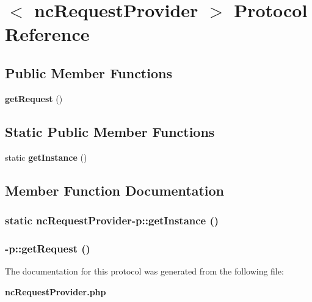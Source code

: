 \section{$<$ ncRequestProvider $>$ Protocol Reference}
\label{protocolncRequestProvider-p}
\subsection*{Public Member Functions}
\begin{CompactItemize}
\item 
{\bf getRequest} ()
\end{CompactItemize}
\subsection*{Static Public Member Functions}
\begin{CompactItemize}
\item 
static {\bf getInstance} ()
\end{CompactItemize}


\subsection{Member Function Documentation}
\subsubsection{\setlength{\rightskip}{0pt plus 5cm}static {\bf ncRequestProvider}-p::getInstance ()\hspace{0.3cm}{\tt  [static]}}\label{protocolncRequestProvider-p_263c854c7c5651e3634644cd694a0402}


\subsubsection{-p::getRequest ()\hspace{0.3cm}{\tt  [abstract]}}\label{protocolncRequestProvider-p_1888ed902ec51f1105ff1bee818c5b0d}




The documentation for this protocol was generated from the following file:\begin{CompactItemize}
\item 
{\bf ncRequestProvider.php}\end{CompactItemize}
